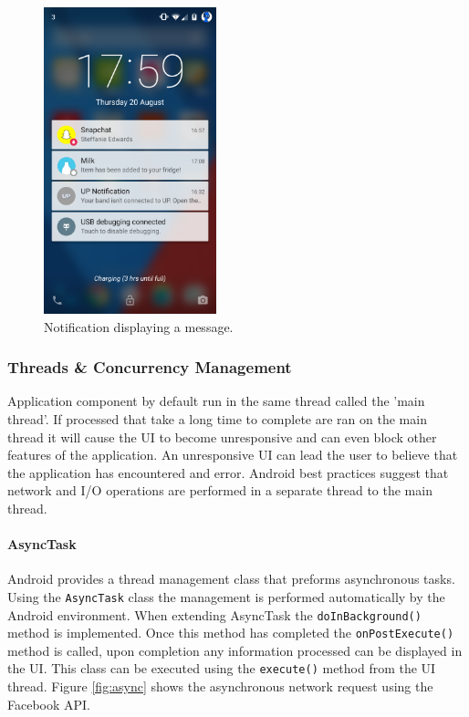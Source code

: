 \documentclass[a4paper, 11pt]{article}
\begin{document}
\begin{figure}[!htbp]
\centering
\includegraphics[width=5cm]{notification}
\caption{Notification displaying a message.} \label{fig:notification}
\end{figure}

\subsubsection{Threads \& Concurrency Management}
Application component by default run in the same thread called the 'main thread'. If processed that take a long time to complete are ran on the main thread it will cause the UI to become unresponsive and can even block other features of the application. An unresponsive UI can lead the user to believe that the application has encountered and error. Android best practices suggest that network and I/O operations are performed in a separate thread to the main thread.

\paragraph{AsyncTask}Android provides a thread management class that preforms asynchronous tasks. Using the \texttt{AsyncTask} class the management is performed automatically by the Android environment. When extending  AsyncTask the \texttt{doInBackground()} method is implemented. Once this method has completed the \texttt{onPostExecute()} method is called, upon completion any information processed can be displayed in the UI. This class can be executed using the \texttt{execute()} method from the UI thread. Figure \ref{fig:async} shows the asynchronous network request using the Facebook API.
\end{document}
